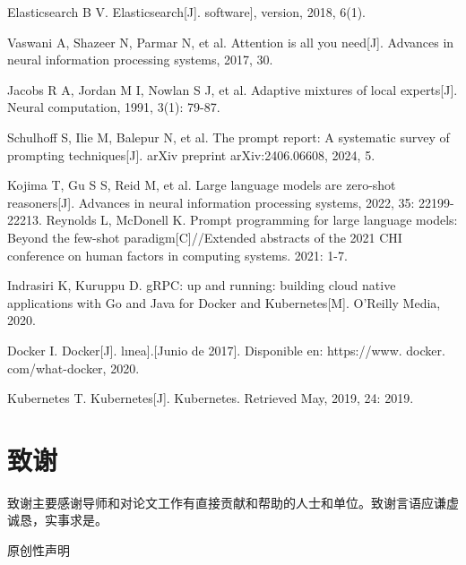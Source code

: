 \documentclass[UTF8,a4paper,12pt]{ctexart}
\numberwithin{equation}{section}
\begin{document}
\begin{thebibliography}{1}
 Elasticsearch B V. Elasticsearch[J]. software], version, 2018, 6(1).

 Vaswani A, Shazeer N, Parmar N, et al. Attention is all you need[J]. Advances in neural information processing systems, 2017, 30.

 Jacobs R A, Jordan M I, Nowlan S J, et al. Adaptive mixtures of local experts[J]. Neural computation, 1991, 3(1): 79-87.

  Schulhoff S, Ilie M, Balepur N, et al. The prompt report: A systematic survey of prompting techniques[J]. arXiv preprint arXiv:2406.06608, 2024, 5.

 Kojima T, Gu S S, Reid M, et al. Large language models are zero-shot reasoners[J]. Advances in neural information processing systems, 2022, 35: 22199-22213.
 Reynolds L, McDonell K. Prompt programming for large language models: Beyond the few-shot paradigm[C]//Extended abstracts of the 2021 CHI conference on human factors in computing systems. 2021: 1-7.

 Indrasiri K, Kuruppu D. gRPC: up and running: building cloud native applications with Go and Java for Docker and Kubernetes[M]. O'Reilly Media, 2020.

 Docker I. Docker[J]. lınea].[Junio de 2017]. Disponible en: https://www. docker. com/what-docker, 2020.

 Kubernetes T. Kubernetes[J]. Kubernetes. Retrieved May, 2019, 24: 2019.


\end{thebibliography}

\newpage
{}

\renewcommand\refname{致谢}

\section*{致\quad 谢}
致谢主要感谢导师和对论文工作有直接贡献和帮助的人士和单位。致谢言语应谦虚诚恳，实事求是。

\newpage
\thispagestyle{empty}

\begin{center}
\heiti {}
原创性声明
\end{center}
\end{document}
